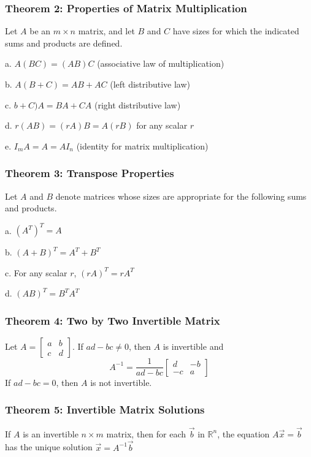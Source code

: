 \documentclass{article}
\begin{document}
\subsubsection*{Theorem 2: Properties of Matrix Multiplication}
Let $A$ be an $m \times n$ matrix, and let $B$ and $C$ have sizes for which the indicated sums and products are defined. 

a. $A(BC) = (AB)C$ (associative law of multiplication)

b. $A(B+C) = AB + AC$ (left distributive law)

c. $b+C)A = BA + CA$ (right distributive law)

d. $r(AB) = (rA)B = A(rB)$ for any scalar $r$

e. $I_m A = A = A I_n$ (identity for matrix multiplication)

\subsubsection*{Theorem 3: Transpose Properties}
Let $A$ and $B$ denote matrices whose sizes are appropriate for the following sums and products. 

a. $(A^T)^T = A$

b. $(A + B)^T = A^T + B^T$

c. For any scalar $r$, $(rA)^T = rA^T$ 

d. $(AB)^T = B^T A^T$

\subsubsection*{Theorem 4: Two by Two Invertible Matrix}
Let $A = \begin{bmatrix}
    a & b \\
    c & d
\end{bmatrix}$. If $ad - bc \neq 0$, then $A$ is invertible and
$$A^{-1} = \frac{1}{ad - bc} \begin{bmatrix}
    d & -b \\
    -c & a
\end{bmatrix}$$
If $ad - bc = 0$, then $A$ is not invertible. 

\subsubsection*{Theorem 5: Invertible Matrix Solutions}
If $A$ is an invertible $n \times m$ matrix, then for each $\vec b$ in $\mathbb{R}^n$, the equation $A \vec x = \vec b$ has the unique solution $\vec x = A^{-1} \vec b$
\end{document}
